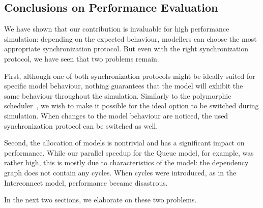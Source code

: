 \subsection{Conclusions on Performance Evaluation}
We have shown that our contribution is invaluable for high performance simulation: depending on the expected behaviour, modellers can choose the most appropriate synchronization protocol.
But even with the right synchronization protocol, we have seen that two problems remain.

First, although one of both synchronization protocols might be ideally suited for specific model behaviour, nothing guarantees that the model will exhibit the same behaviour throughout the simulation.
Similarly to the polymorphic scheduler~\cite{MasterThesis}, we wish to make it possible for the ideal option to be switched during simulation.
When changes to the model behaviour are noticed, the used synchronization protocol can be switched as well. 

Second, the allocation of models is nontrivial and has a significant impact on performance.
While our parallel speedup for the Queue model, for example, was rather high, this is mostly due to characteristics of the model: the dependency graph does not contain any cycles.
When cycles were introduced, as in the Interconnect model, performance became disastrous.

In the next two sections, we elaborate on these two problems.
